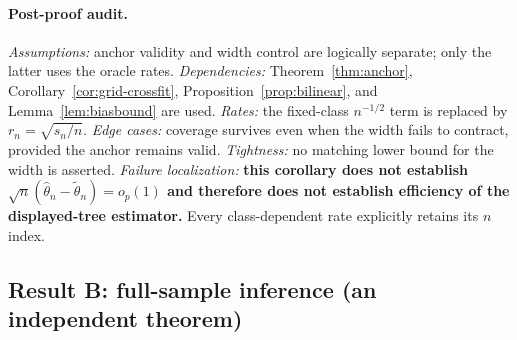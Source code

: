 \documentclass[11pt]{article}
\theoremstyle{plain}
\theoremstyle{definition}
\theoremstyle{remark}
\newcommand{\thetatil}{\widetilde{\theta}}
\begin{document}
\paragraph{Post-proof audit.}
\emph{Assumptions:} anchor validity and width control are logically
separate; only the latter uses the oracle rates.
\emph{Dependencies:} Theorem~\ref{thm:anchor}, Corollary~\ref{cor:grid-crossfit},
Proposition~\ref{prop:bilinear}, and Lemma~\ref{lem:biasbound} are used.
\emph{Rates:} the fixed-class $n^{-1/2}$ term is replaced by
$r_n=\sqrt{s_n/n}$.
\emph{Edge cases:} coverage survives even when the width fails to contract,
provided the anchor remains valid.
\emph{Tightness:} no matching lower bound for the width is asserted.
\emph{Failure localization:} \textbf{this corollary does not establish
$\sqrt n(\widehat\theta_n-\thetatil_n)=o_p(1)$ and therefore does not
establish efficiency of the displayed-tree estimator.} Every
class-dependent rate explicitly retains its $n$ index.

\subsection{Result B: full-sample inference (an independent theorem)}\label{sec:result-b}
\end{document}
